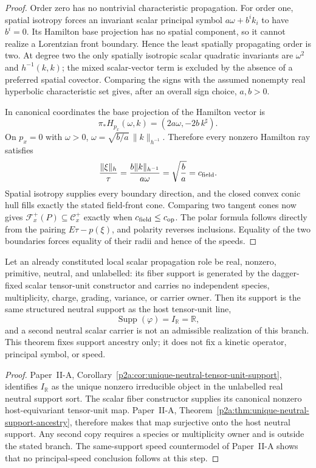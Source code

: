 \documentclass[12pt,a4paper]{article}
\begin{document}
\begin{proof}
Order zero has no nontrivial characteristic propagation.  For order one,
spatial isotropy forces an invariant scalar principal symbol
\(a\omega+b^ik_i\) to have \(b^i=0\).  Its Hamilton base projection has no
spatial component, so it cannot realize a Lorentzian front boundary.  Hence
the least spatially propagating order is
two.  At degree two the only spatially isotropic scalar quadratic invariants are
\(\omega^2\) and \(h^{-1}(k,k)\); the mixed scalar-vector term is
excluded by the absence of a preferred spatial covector.  Comparing the
signs with the assumed nonempty real hyperbolic characteristic set gives,
after an overall sign choice, \(a,b>0\).

In canonical coordinates the base projection of the Hamilton vector is
\[
 \pi_*H_{p_x}(\omega,k)
 =(2a\omega,-2b\,k^\sharp).
\]
On \(p_x=0\) with \(\omega>0\),
\(\omega=\sqrt{b/a}\,\|k\|_{h^{-1}}\).  Therefore every nonzero Hamilton
ray satisfies
\[
 \frac{\|\xi\|_h}{\tau}
 =\frac{b\|k\|_{h^{-1}}}{a\omega}
 =\sqrt{\frac ba}=c_{\rm field}.
\]
Spatial isotropy supplies every boundary direction, and the closed convex
conic hull fills exactly the stated field-front cone.  Comparing two tangent
cones now gives
\(\mathcal F_x^+(P)\subseteq\mathcal C_x^+\) exactly when
\(c_{\rm field}\le c_{\rm op}\).  The polar formula follows directly from
the pairing \(E\tau-p(\xi)\), and polarity reverses inclusions.  Equality of
the two boundaries forces equality of their radii and hence of the speeds.
\end{proof}


\begin{theorem}
\label{p3e:thm:primitive-scalar-support-ancestry}
Let an already constituted local scalar propagation role be real, nonzero,
primitive, neutral, and unlabelled: its fiber support is generated by the
dagger-fixed scalar tensor-unit constructor and carries no independent
species, multiplicity, charge, grading, variance, or carrier owner.  Then its
support is the same structured neutral support as the host tensor-unit line,
\[
 \boxed{\operatorname{Supp}(\varphi)=I_{\mathbb R}=\mathbb R,}
\]
and a second neutral scalar carrier is not an admissible realization of this
branch.  This theorem fixes support ancestry only; it does not fix a kinetic
operator, principal symbol, or speed.
\end{theorem}

\begin{proof}
Paper~II-A,
Corollary~\ref{p2a:cor:unique-neutral-tensor-unit-support}, identifies
\(I_{\mathbb R}\) as the unique nonzero irreducible object in the unlabelled
real neutral support sort.  The scalar fiber constructor supplies its
canonical nonzero host-equivariant tensor-unit map.  Paper~II-A,
Theorem~\ref{p2a:thm:unique-neutral-support-ancestry}, therefore makes that
map surjective onto the host neutral support.  Any second copy requires a
species or multiplicity owner and is outside the stated branch.  The
same-support speed countermodel of Paper~II-A shows that no principal-speed
conclusion follows at this step.
\end{proof}
\end{document}
